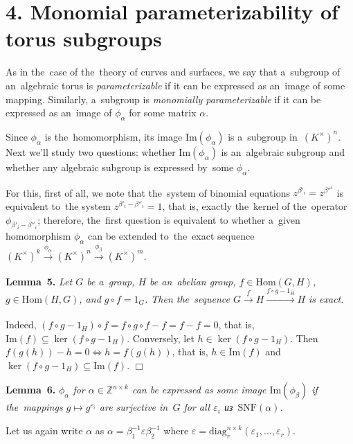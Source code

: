 \documentclass[twoside]{article}
\begin{document}
\section*{4. Monomial parameterizability of torus subgroups}

As in the~case of the~theory of curves and surfaces, we say that a~subgroup of an~algebraic torus
is \textit{parameterizable} if it can be expressed as an~image of some mapping. Similarly, a~subgroup
is \textit{monomially parameterizable} if it can be expressed as an~image of $\phi_\alpha$ for some matrix $\alpha$.

Since $\phi_\alpha$ is the~homomorphism, its image $\mathrm{Im}(\phi_\alpha)$ is a~subgroup in~$(K^\times)^n$.
Next we'll study two questions: whether $\mathrm{Im}(\phi_\alpha)$ is an~algebraic subgroup and whether
any algebraic subgroup is expressed by~some $\phi_\alpha$.

For this, first of all, we note that the~system of binomial equations $z^{\beta'_i} = z^{\beta''^i}$ is equivalent
to~the system $z^{\beta'_i - \beta''_i} = 1$, that is, exactly the~kernel of the~operator $\phi_{\beta'_i - \beta''_i}$;
therefore, the~first question is equivalent to whether a~given homomorphism $\phi_\alpha$ can be extended
to~the~exact sequence $(K^\times)^k \xrightarrow[]{\phi_\alpha} (K^\times)^n \xrightarrow[]{\phi_\beta} (K^\times)^m$.

\medskip\noindent\textbf{Lemma~5.}\emph{
    Let $G$ be a~group, $H$ be an~abelian group, $f \in \mathrm{Hom}(G, H)$, $g \in \mathrm{Hom}(H, G)$, and $g \circ f = 1_G$.
    Then the~sequence $G \xrightarrow[]{f} H \xrightarrow[]{f \circ g - 1_H} H$ is exact.
}\medskip

    Indeed, $(f \circ g - 1_H) \circ f = f \circ g \circ f - f = f - f = 0$, that is, $\mathrm{Im}(f) \subseteq \ker(f \circ g - 1_H)$.
    Conversely, let $h \in \ker(f \circ g - 1_H)$. Then $f(g(h)) - h = 0 \Leftrightarrow h = f(g(h))$, that is, $h \in \mathrm{Im}(f)$
    and $\ker(f \circ g - 1_H) \subseteq \mathrm{Im}(f)$.
\hfill$\Box$\medskip

\medskip\noindent\textbf{Lemma~6.}\emph{
    $\phi_\alpha$ for $\alpha \in \mathbb{Z}^{n \times k}$ can be expressed as some image $\mathrm{Im}(\phi_\beta)$
    if the~mappings $g \mapsto g^{\varepsilon_i}$ are surjective in~$G$ for all $\varepsilon_i$ из~$\mathrm{SNF}(\alpha)$.
}\medskip

    Let us again write $\alpha$ as $\alpha = \beta_1^{-1} \varepsilon \beta_2^{-1}$ where
    $
        \varepsilon = \mathrm{diag}^{n \times k}_r(\varepsilon_1, \ldots, \varepsilon_r).
    $
\end{document}
